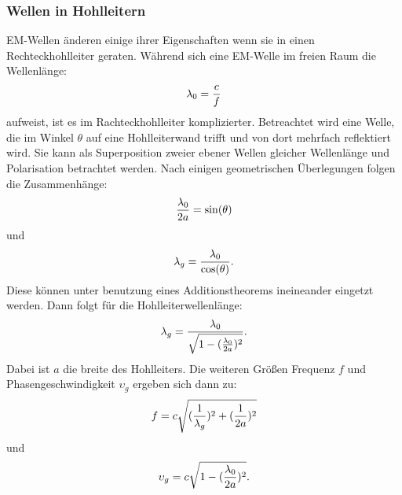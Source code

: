 \subsubsection{Wellen in Hohlleitern}
EM-Wellen änderen einige ihrer Eigenschaften wenn sie in einen Rechteckhohlleiter geraten. Während sich eine 
EM-Welle im freien Raum die Wellenlänge:
\begin{equation}
    \lambda_0=\frac{c}{f}\\
\end{equation}
aufweist, ist es im Rachteckhohlleiter komplizierter. Betreachtet wird eine Welle, die im Winkel $\theta$ auf 
eine Hohlleiterwand trifft und von dort mehrfach reflektiert wird. Sie kann als Superposition zweier ebener 
Wellen gleicher Wellenlänge und Polarisation betrachtet werden. Nach einigen geometrischen Überlegungen
folgen die Zusammenhänge:
\begin{equation}
    \frac{\lambda_0}{2a}=\sin(\theta)\\
\end{equation}
und
\begin{equation}
    \lambda_g=\frac{\lambda_0}{\cos(\theta)}.\\
\end{equation}
Diese können unter benutzung eines Additionstheorems ineineander eingetzt werden. Dann folgt für die Hohlleiterwellenlänge:
\begin{equation}
    \lambda_g=\frac{\lambda_0}{\sqrt{1-(\frac{\lambda_0}{2a})^2}}.\\
\end{equation}
Dabei ist $a$ die breite des Hohlleiters. Die weiteren Größen Frequenz $f$ und Phasengeschwindigkeit $\upsilon_g$ 
ergeben sich dann zu:
\begin{equation}
    f=c\sqrt{(\frac{1}{\lambda_g})^2+(\frac{1}{2a})^2}\\
\end{equation}
und 
\begin{equation}
    \upsilon_g=c\sqrt{1-(\frac{\lambda_0}{2a})^2}.\\
\end{equation}